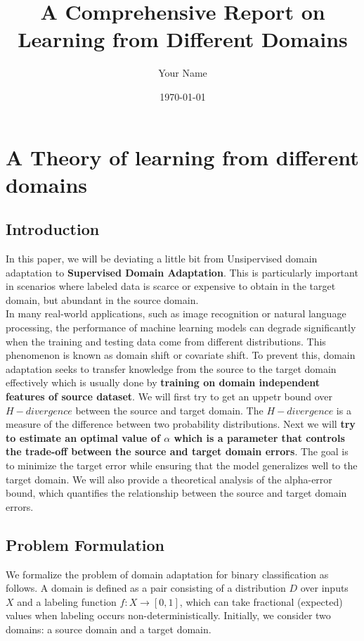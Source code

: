\documentclass{article}
\title{A Comprehensive Report on Learning from Different Domains}
\author{Your Name}
\date{\today}
\begin{document}
\maketitle
\tableofcontents
\section{A Theory of learning from different domains}

\subsection{Introduction}
In this paper, we will be deviating a little bit from Unsipervised domain adaptation to \textbf{Supervised Domain Adaptation}. This is particularly important in scenarios where labeled data is scarce or expensive to obtain in the target domain, but abundant in the source domain. \\
In many real-world applications, such as image recognition or natural language processing, the performance of machine learning models can degrade significantly when the training and testing data come from different distributions. This phenomenon is known as domain shift or covariate shift. To prevent this, domain adaptation seeks to transfer knowledge from the source to the target domain effectively which is usually done by \textbf{training on domain independent features of source dataset}. We will first try to get an uppetr bound over $H- divergence$ between the source and target domain. The $H- divergence$ is a measure of the difference between two probability distributions. Next we will \textbf{try to estimate an optimal value of $\alpha$ which is a parameter that controls the trade-off between the source and target domain errors}. The goal is to minimize the target error while ensuring that the model generalizes well to the target domain. We will also provide a theoretical analysis of the alpha-error bound, which quantifies the relationship between the source and target domain errors.

\subsection{Problem Formulation}
We formalize the problem of domain adaptation for binary classification as follows. A domain is defined as a pair consisting of a distribution $D$ over inputs $X$ and a labeling function $f : X \to [0,1]$, which can take fractional (expected) values when labeling occurs non-deterministically. Initially, we consider two domains: a source domain and a target domain. 
\end{document}
